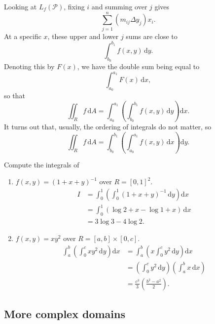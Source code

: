 \documentclass[letter-paper]{tufte-book}
\newenvironment{example}[1][Example]{\begin{trivlist}
\item[\hskip \labelsep {\bfseries #1}]}{\end{trivlist}}
\begin{document}
Looking at $L_f(\mathcal{P})$, fixing $i$ and summing over $j$ gives
\begin{equation*}
  \sum_{j=1}^n (m_{ij} \Delta y_j) x_i.
\end{equation*}
At a specific $x$, these upper and lower $j$ sums are close to
\begin{equation*}
  \int_{b_0}^{b_1} f(x,y)\, \mathrm{d}y.
\end{equation*}
Denoting this by $F(x)$, we have the double sum being equal to
\begin{equation*}
  \int_{a_0}^{a_1} F(x)\, \mathrm{d}x,
\end{equation*}
so that
\begin{equation*}
  \iint_R f\, \mathrm{d}A = \int_{a_0}^{a_1} \left( \int_{b_0}^{b_1}
  f(x,y)\, \mathrm{d}y \right) \mathrm{d}x.
\end{equation*}
It turns out that, usually, the ordering of integrals do not matter, so
\begin{equation*}
  \iint_R f\, \mathrm{d}A = \int_{b_0}^{b_1} \left( \int_{a_0}^{a_1}
  f(x,y)\, \mathrm{d}x \right) \mathrm{d}y.
\end{equation*}
\begin{example}
  Compute the integrals of
  \begin{enumerate}
    \item $f(x,y) = (1+x+y)^{-1}$ over $R = [0,1]^2$.
    \begin{align*}
      I &= \int_0^1 \left( \int_0^1 (1+x+y)^{-1}\, \mathrm{d}y \right)\mathrm{d}x \\
        &= \int_0^1 (\log 2 + x - \log 1 + x)\, \mathrm{d}x \\
        &= 3\log 3 - 4\log 2.
    \end{align*}
    
    \item $f(x,y) = xy^2$ over $R = [a,b]\times[0,c]$.
    \begin{align*}
      \int_a^b \left(\int_0^c xy^2\, \mathrm{d}y\right)\mathrm{d}x & = \int_a^b \left(x\int_0^c y^2\, \mathrm{d}y\right)\mathrm{d}x \\
        &= \left(\int_0^c y^2\, \mathrm{d}y\right) \left(\int_a^b x\, \mathrm{d}x\right) \\
        &= \frac{c^3}{3}\left(\frac{b^2 - a^2}{2}\right).
    \end{align*}
  \end{enumerate}
\end{example}

\subsection{More complex domains}
\end{document}
